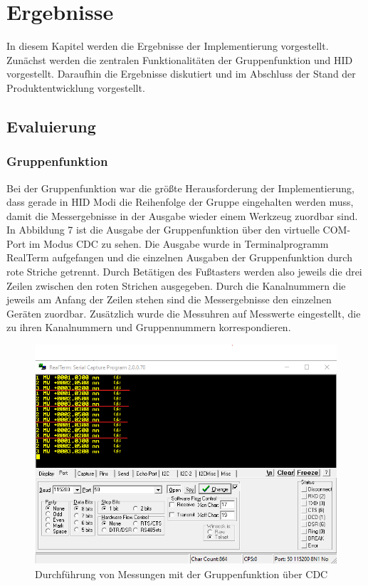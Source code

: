 \section{Ergebnisse}
In diesem Kapitel werden die Ergebnisse der Implementierung vorgestellt. Zunächst werden die zentralen Funktionalitäten der Gruppenfunktion und HID vorgestellt. Daraufhin die Ergebnisse diskutiert und im Abschluss der Stand der Produktentwicklung vorgestellt.

\subsection{Evaluierung}


\subsubsection{Gruppenfunktion}
Bei der Gruppenfunktion war die größte Herausforderung der Implementierung, dass gerade in HID Modi die Reihenfolge der Gruppe eingehalten werden muss, damit die Messergebnisse in der Ausgabe wieder einem Werkzeug zuordbar sind. In Abbildung 7 ist die Ausgabe der Gruppenfunktion über den virtuelle COM-Port im Modus CDC zu sehen. Die Ausgabe wurde in Terminalprogramm RealTerm aufgefangen und die einzelnen Ausgaben der Gruppenfunktion durch rote Striche getrennt. Durch Betätigen des Fußtasters werden also jeweils die drei Zeilen zwischen den roten Strichen ausgegeben. Durch die Kanalnummern die jeweils am Anfang der Zeilen stehen sind die Messergebnisse den einzelnen Geräten zuordbar. Zusätzlich wurde die Messuhren auf Messwerte eingestellt, die zu ihren Kanalnummern und Gruppennummern korrespondieren. 
\begin{figure}[H] 
	\centering
	\includegraphics[width=\textwidth]{figures/GroupFeature.png}
	\caption{Durchführung von Messungen mit der Gruppenfunktion über CDC}
\end{figure}

